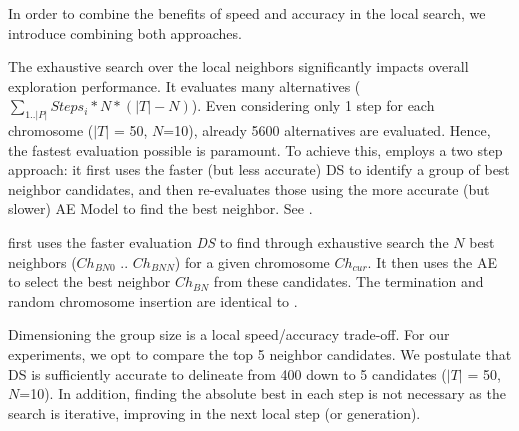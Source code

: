 \subsubsection{\gah}

In order to combine the benefits of \gads speed  and \gaana accuracy in the local search, we introduce \gah combining both approaches.

The exhaustive search over the local neighbors significantly impacts overall exploration performance. It evaluates many alternatives ($ \sum_{1 .. \lvert P \rvert} Steps_{i} * N * (\lvert T \rvert - N)$). Even considering only 1 step for each chromosome ($\lvert T \rvert$ = 50, $N$=10), already 5600 alternatives are evaluated. Hence, the fastest evaluation possible is paramount. To achieve this, \gah employs a two step approach: it first uses the faster (but less accurate) DS to identify a group of best neighbor candidates, and then re-evaluates those using the more accurate (but slower) AE Model to find the best neighbor. See . 

\gah first uses the faster evaluation \emph{DS} to find through exhaustive search the $N$ best neighbors ($Ch_{BN0}$ .. $Ch_{BNN}$) for a given chromosome $Ch_{cur}$. It then uses the AE to select the best neighbor $Ch_{BN}$ from these candidates. The termination and random chromosome insertion are identical to \gads.

Dimensioning the group size is a local speed/accuracy trade-off. For our experiments, we opt to compare the top 5 neighbor candidates. We postulate that DS is sufficiently accurate to delineate from 400 down to 5 candidates ($\lvert T \rvert$ = 50, $N$=10). In addition, finding the absolute best in each step is not necessary as the search is iterative, improving in the next local step (or generation).


